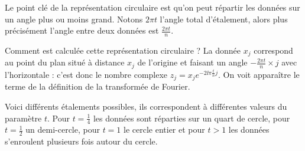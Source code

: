 \documentclass[11pt,class=report,crop=false]{standalone}
\begin{document}
Le point clé de la représentation circulaire est qu'on peut répartir les données sur un angle plus ou moins grand. Notons $2\pi t$ l'angle total d'étalement, alors plus précisément l'angle entre deux données est $\frac{2\pi t}{n}$.

Comment est calculée cette représentation circulaire ? La donnée $x_j$ correspond au point du plan situé à distance $x_j$ de l'origine et faisant un angle $-\frac{2\pi t}{n} \times j$ avec l'horizontale : c'est donc le nombre complexe $z_j = x_j e^{-2 \ii \pi \frac{t}{n} j}$. On voit apparaître le terme de la définition de la transformée de Fourier.


Voici différents étalements possibles, ils correspondent à différentes valeurs du paramètre $t$.
Pour $t=\frac14$ les données sont réparties sur un quart de cercle, pour $t=\frac12$ un demi-cercle, pour $t=1$ le cercle entier et pour $t>1$ les données s'enroulent plusieurs fois autour du cercle.
\end{document}
